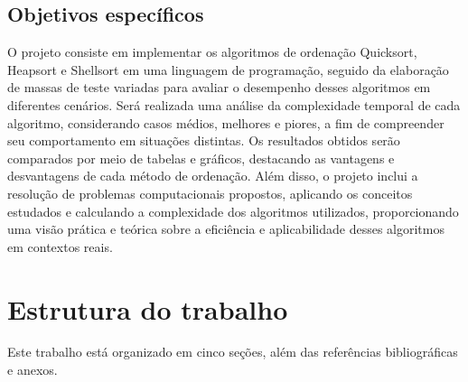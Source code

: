 \subsection{Objetivos específicos}
\label{subsec:objetivosespecificos }

O projeto consiste em implementar os algoritmos de ordenação Quicksort, Heapsort e Shellsort em uma linguagem de programação, seguido da elaboração de massas de teste variadas para avaliar o desempenho desses algoritmos em diferentes cenários. Será realizada uma análise da complexidade temporal de cada algoritmo, considerando casos médios, melhores e piores, a fim de compreender seu comportamento em situações distintas. Os resultados obtidos serão comparados por meio de tabelas e gráficos, destacando as vantagens e desvantagens de cada método de ordenação. Além disso, o projeto inclui a resolução de problemas computacionais propostos, aplicando os conceitos estudados e calculando a complexidade dos algoritmos utilizados, proporcionando uma visão prática e teórica sobre a eficiência e aplicabilidade desses algoritmos em contextos reais.



\section{Estrutura do trabalho}
\label{sec:estrututaTrabalho }

Este trabalho está organizado em cinco seções, além das referências bibliográficas e anexos.

